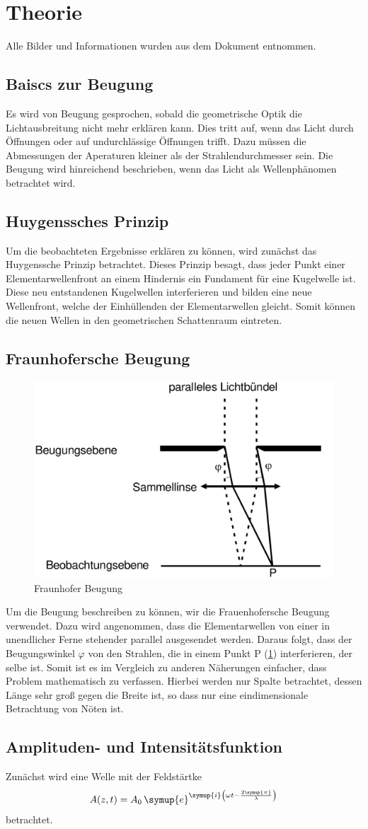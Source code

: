 \section{Theorie}
\label{sec:Theorie}
Alle Bilder und Informationen wurden aus dem Dokument \cite{v406} entnommen.\\
\subsection{Baiscs zur Beugung}
Es wird von Beugung gesprochen, sobald die geometrische Optik die Lichtausbreitung nicht mehr erklären kann. 
Dies tritt auf, wenn das Licht durch Öffnungen oder auf undurchlässige Öffnungen trifft. 
Dazu müssen die Abmessungen der Aperaturen kleiner als der Strahlendurchmesser sein.
Die Beugung wird hinreichend beschrieben, wenn das Licht als Wellenphänomen betrachtet wird.
\subsection{Huygenssches Prinzip}
Um die beobachteten Ergebnisse erklären zu können, wird zunächst das Huygenssche Prinzip betrachtet.
Dieses Prinzip besagt, dass jeder Punkt einer Elementarwellenfront an einem Hindernis ein Fundament für eine Kugelwelle ist.
Diese neu entstandenen Kugelwellen interferieren und bilden eine neue Wellenfront, welche der Einhüllenden der Elementarwellen gleicht.
Somit können die neuen Wellen in den geometrischen Schattenraum eintreten.
\subsection{Fraunhofersche Beugung}
\begin{figure}
    \centering
    \caption{Fraunhofer Beugung}
    \label{fig:Fraunhofer}
    \includegraphics[width = 0.5 \textwidth]{pics/Frauenhofer.PNG}
\end{figure}
Um die Beugung beschreiben zu können, wir die Frauenhofersche Beugung verwendet.
Dazu wird angenommen, dass die Elementarwellen von einer in unendlicher Ferne stehender parallel ausgesendet werden.
Daraus folgt, dass der Beugungswinkel $\varphi $ von den Strahlen, die in einem Punkt P (\ref{fig:Fraunhofer}) interferieren,
der selbe ist. 
Somit ist es im Vergleich zu anderen Näherungen einfacher, dass Problem mathematisch zu verfassen.
Hierbei werden nur Spalte betrachtet, dessen Länge sehr groß gegen die Breite ist, so dass nur eine eindimensionale Betrachtung von Nöten ist.
\subsection{Amplituden- und Intensitätsfunktion}
Zunächst wird eine Welle mit der Feldstärtke 
\begin{equation}
    A(z, t) = A_0 \, \symup{e}^{\symup{i} \left (\omega t - \frac{2\symup{\pi}}{\lambda} \right )}
\end{equation}
betrachtet.